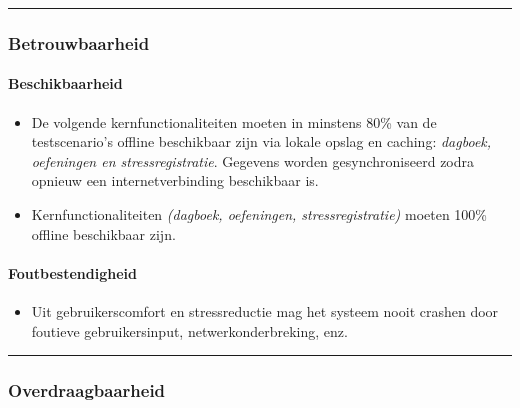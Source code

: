 \vspace{1em}
\vspace{1em}
\hrule
\vspace{1em}

\subsubsection{Betrouwbaarheid}
\label{subsubsec:betrouwbaarheid}

\vspace{1em}

\paragraph{Beschikbaarheid}
\vspace{1em}

\begin{itemize}
    \item De volgende kernfunctionaliteiten moeten in minstens 80\% van de testscenario’s offline beschikbaar zijn via lokale opslag en caching: \textit{dagboek, oefeningen en stressregistratie}. Gegevens worden gesynchroniseerd zodra opnieuw een internetverbinding beschikbaar is.
\end{itemize}

\begin{itemize}
    \item Kernfunctionaliteiten \textit{(dagboek, oefeningen, stressregistratie)} moeten 100\% offline beschikbaar zijn.
\end{itemize}

\paragraph{Foutbestendigheid}
\vspace{1em}

\begin{itemize}
    \item Uit gebruikerscomfort en stressreductie mag het systeem nooit crashen door foutieve gebruikersinput, netwerkonderbreking, enz.
\end{itemize}

\vspace{1em}
\vspace{1em}
\hrule
\vspace{1em}

\subsubsection{Overdraagbaarheid}
\label{subsubsec:overdraagbaarheid}

